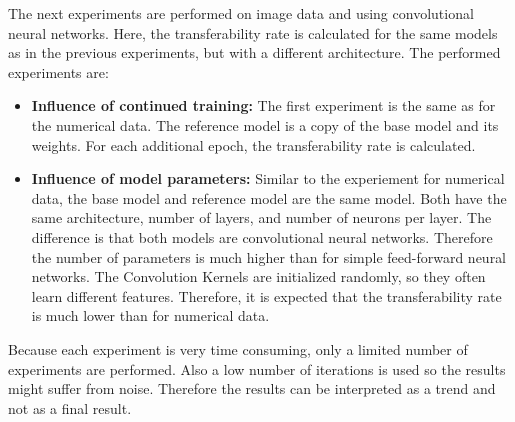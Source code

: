 \documentclass{article}
\begin{document}
The next experiments are performed on image data and using convolutional neural networks. Here, the transferability rate is calculated for the same models as in the previous experiments, but with a different architecture. The performed experiments are:
\begin{itemize}
    \item \textbf{Influence of continued training:} The first experiment is the same as for the numerical data. The reference model is a copy of the base model and its weights. For each additional epoch, the transferability rate is calculated. 
    \item \textbf{Influence of model parameters:} Similar to the experiement for numerical data, the base model and reference model are the same model. Both have the same architecture, number of layers, and number of neurons per layer. The difference is that both models are convolutional neural networks. Therefore the number of parameters is much higher than for simple feed-forward neural networks. The Convolution Kernels are initialized randomly, so they often learn different features. Therefore, it is expected that the transferability rate is much lower than for numerical data.
\end{itemize} 
Because each experiment is very time consuming, only a limited number of experiments are performed. Also a low number of iterations is used so the results might suffer from noise. Therefore the results can be interpreted as a trend and not as a final result. 
\end{document}
